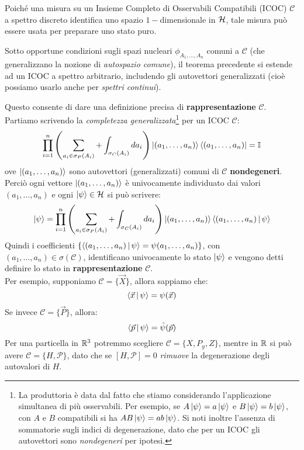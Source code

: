\documentclass[../../FisicaTeorica.tex]{subfiles}
\begin{document}
\begin{oss}
Poiché una misura su un Insieme Completo di Osservabili Compatibili (ICOC) $\mathcal{C}$ a spettro discreto identifica uno spazio $1-$dimensionale in $\mathcal{H}$, tale misura può essere usata per preparare uno stato puro.
\end{oss}
\begin{oss}
Sotto opportune condizioni sugli spazi nucleari $\phi_{A_1,\dots,A_n}$ comuni a $\mathcal{C}$ (che generalizzano la nozione di \textit{autospazio comune}), il teorema precedente si estende ad un ICOC a spettro arbitrario, includendo gli autovettori generalizzati (cioè possiamo usarlo anche per \textit{spettri continui}).
\end{oss}
Questo consente di dare una definizione precisa di \textbf{rappresentazione} $\mathcal{C}$.\\
Partiamo scrivendo la \textit{completezza generalizzata}\footnote{La produttoria è data dal fatto che stiamo considerando l'applicazione simultanea di più osservabili. Per esempio, se $A\Ket{\psi}=a\Ket{\psi}$ e $B\Ket{\psi}=b\Ket{\psi}$, con $A$ e $B$ compatibili si ha $AB\Ket{\psi}=ab\Ket{\psi}$. Si noti inoltre l'assenza di sommatorie sugli indici di degenerazione, dato che per un ICOC gli autovettori sono \textit{nondegeneri} per ipotesi.} per un ICOC $\mathcal{C}$:
\[
\prod_{i=1}^n \left(\sum_{a_i \in \sigma_P(A_i)} + \int_{\sigma_C(A_i)} da_i\right) \Ket{(a_1,\dots,a_n)}\Bra{(a_1,\dots,a_n)}=\mathbb{I}
\]
ove $\Ket{(a_1, \dots, a_n)}$ sono autovettori (generalizzati) comuni di $\mathcal{C}$ \textbf{nondegeneri}. Perciò ogni vettore $\Ket{(a_1, \dots, a_n)}$ è univocamente individuato dai valori $(a_1, \dots, a_n)$ e ogni $\Ket{\psi}\in \mathcal{H}$ si può scrivere:
\[
\Ket{\psi}=\prod_{i=1}^n \left(\sum_{a_i\in \sigma_P(A_i)} + \int_{\sigma_C(A_i)}da_i \right) \Ket{(a_1, \dots, a_n)}\Braket{(a_1, \dots, a_n)|\psi}
\]
Quindi i coefficienti $\{\Braket{(a_1, \dots, a_n)|\psi}=\psi(a_1, \dots, a_n)\}$, con $(a_1, \dots, a_n)\in \sigma(\mathcal{C})$, identificano univocamente lo stato $\Ket{\psi}$ e vengono detti definire lo stato in \textbf{rappresentazione }$\mathcal{C}$.\\
Per esempio, supponiamo $\mathcal{C}=\{\vec{X}\}$, allora sappiamo che:
\[
\Braket{\vec{x}|\psi}=\psi(\vec{x})
\]
Se invece $\mathcal{C}=\{\vec{P}\}$, allora:
\[
\Braket{\vec{p}|\psi}=\tilde{\psi}(\vec{p})
\]
Per una particella in $\mathbb{R}^3$ potremmo scegliere $\mathcal{C}=\{X,P_y, Z\}$, mentre in $\mathbb{R}$ si può avere $\mathcal{C}=\{H, \mathcal{P}\}$, dato che se $[H,\mathcal{P}]=0$ \textit{rimuove} la degenerazione degli autovalori di $H$.
\end{document}
